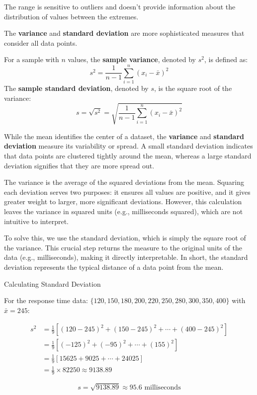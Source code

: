 \begin{remark}
The range is sensitive to outliers and doesn't provide information about the distribution of values between the extremes.
\end{remark}

The \textbf{variance} and \textbf{standard deviation} are more sophisticated measures that consider all data points.

\begin{definition}
For a sample with $n$ values, the \textbf{sample variance}, denoted by $s^2$, is defined as:
$$
s^2 = \frac{1}{n-1}\sum_{i=1}^{n}(x_i - \bar{x})^2
$$
The \textbf{sample standard deviation}, denoted by $s$, is the square root of the variance:
$$
s = \sqrt{s^2} = \sqrt{\frac{1}{n-1}\sum_{i=1}^{n}(x_i - \bar{x})^2}
$$
\end{definition}

While the mean identifies the center of a dataset, the \textbf{variance} and \textbf{standard deviation} measure its variability or spread. A small standard deviation indicates that data points are clustered tightly around the mean, whereas a large standard deviation signifies that they are more spread out.

The variance is the average of the squared deviations from the mean. Squaring each deviation serves two purposes: it ensures all values are positive, and it gives greater weight to larger, more significant deviations. However, this calculation leaves the variance in squared units (e.g., milliseconds squared), which are not intuitive to interpret.

To solve this, we use the standard deviation, which is simply the square root of the variance. This crucial step returns the measure to the original units of the data (e.g., milliseconds), making it directly interpretable. In short, the standard deviation represents the typical distance of a data point from the mean.

\begin{example} Calculating Standard Deviation

    For the response time data: $\{120, 150, 180, 200, 220, 250, 280, 300, 350, 400\}$ with $\bar{x} = 245$:

\begin{align*}
s^2 &= \frac{1}{9}[(120-245)^2 + (150-245)^2 + \cdots + (400-245)^2] \\
&= \frac{1}{9}[(-125)^2 + (-95)^2 + \cdots + (155)^2] \\
&= \frac{1}{9}[15625 + 9025 + \cdots + 24025] \\
&= \frac{1}{9} \times 82250 \approx 9138.89
\end{align*}

\[
s = \sqrt{9138.89} \approx 95.6 \text{ milliseconds}
\]
\end{example}

